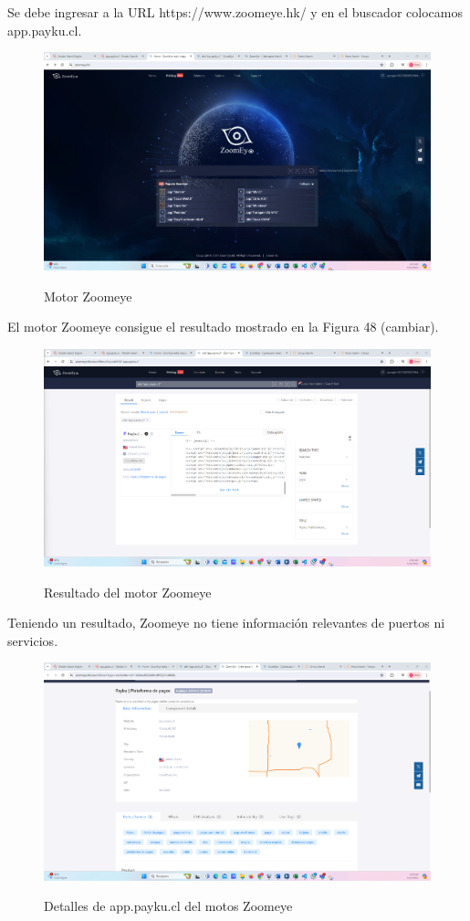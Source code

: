 \documentclass[stu, 11pt, letterpaper, donotrepeattitle, floatsintext, natbib]{apa7}
\begin{document}
Se debe ingresar a la URL https://www.zoomeye.hk/ y en el buscador colocamos app.payku.cl.

\begin{figure}[H]
    \centering
    \caption{Motor Zoomeye}
    \includegraphics[width=0.75\linewidth]{ac63.png} %
    \label{fig:OverallEffect}
\end{figure}

El motor Zoomeye consigue el resultado mostrado en la Figura 48 (cambiar).

\begin{figure}[H]
    \centering
    \caption{Resultado del motor Zoomeye}
    \includegraphics[width=0.75\linewidth]{ac64.png} %
    \label{fig:OverallEffect}
\end{figure}

Teniendo un resultado, Zoomeye no tiene información relevantes de puertos ni servicios.

\begin{figure}[H]
    \centering
    \caption{Detalles de app.payku.cl del motos Zoomeye}
    \includegraphics[width=0.75\linewidth]{ac65.png} %
    \label{fig:OverallEffect}
\end{figure}
\end{document}
